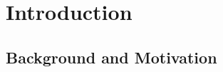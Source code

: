 \section{Introduction}
\label{sec:introduction}

\subsection{Background and Motivation}
\label{sec:background_and_motivation}



